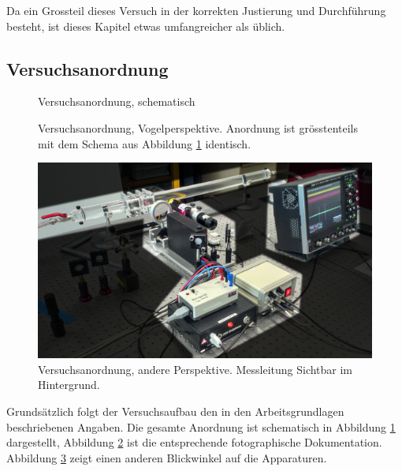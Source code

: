 Da ein Grossteil dieses Versuch in der korrekten Justierung und Durchf\"uhrung
besteht, ist dieses Kapitel etwas umfangreicher als \"ublich.

\subsection{Versuchsanordnung}
\label{subsec:versuchsanordnung}

\begin{figure}[h!t]
    \centering
    \resizebox{\textwidth}{!}{}
    \caption{%
        Versuchsanordnung, schematisch
    }
    \label{fig:versuchsanordnung:schema}
\end{figure}

\begin{figure}[h!t]
    \centering
    \resizebox{.67\textwidth}{!}{}
    \caption{%
        Versuchsanordnung, Vogelperspektive. Anordnung ist gr\"osstenteils mit
        dem Schema aus Abbildung \ref{fig:versuchsanordnung:schema} identisch.
    }
    \label{fig:versuchsanordnung:birdseye}
\end{figure}

\begin{figure}[h!t]
    \centering
    \includegraphics[width=.67\textwidth]{images/versuchsanordnung2.jpeg}
    \caption{%
        Versuchsanordnung,   andere   Perspektive. Messleitung   Sichtbar   im
        Hintergrund.
    }
    \label{fig:versuchsanordnung:perspective}
\end{figure}

Grunds\"atzlich  folgt   der  Versuchsaufbau  den  in   den  Arbeitsgrundlagen
beschriebenen    Angaben. Die   gesamte    Anordnung   ist    schematisch   in
Abbildung     \ref{fig:versuchsanordnung:schema}    dargestellt,     Abbildung
\ref{fig:versuchsanordnung:birdseye}  ist   die  entsprechende  fotographische
Dokumentation.  Abbildung  \ref{fig:versuchsanordnung:perspective} zeigt einen
anderen Blickwinkel auf die Apparaturen.

